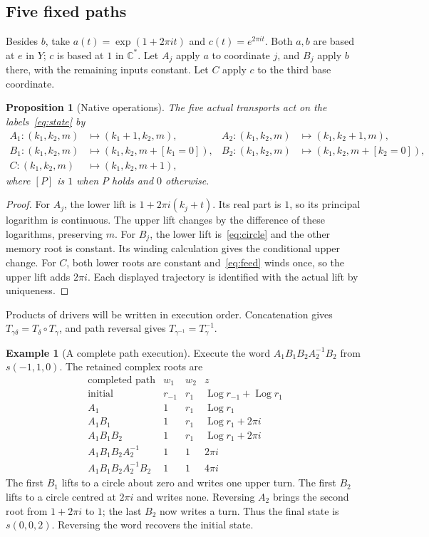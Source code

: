 \documentclass[11pt]{article}
\theoremstyle{definition}
\newtheorem{example}[definition]{Example}
\theoremstyle{plain}
\newtheorem{proposition}[definition]{Proposition}
\newcommand{\C}{\mathbb C}
\newcommand{\Log}{\operatorname{Log}}
\begin{document}
\subsection*{Five fixed paths}
Besides $b$, take $a(t)=\exp(1+2\pi it)$ and $c(t)=e^{2\pi it}$.
Both $a,b$ are based at $e$ in $Y$; $c$ is based at $1$ in $\C^*$.
Let $A_j$ apply $a$ to coordinate $j$, and $B_j$ apply $b$ there,
with the remaining inputs constant. Let $C$ apply $c$ to the third
base coordinate.

\begin{proposition}[Native operations]\label{prop:gates}
The five actual transports act on the labels~\eqref{eq:state} by
\begin{align*}
 A_1:(k_1,k_2,m)&\longmapsto(k_1+1,k_2,m),&
 A_2:(k_1,k_2,m)&\longmapsto(k_1,k_2+1,m),\\
 B_1:(k_1,k_2,m)&\longmapsto(k_1,k_2,m+[k_1=0]),&
 B_2:(k_1,k_2,m)&\longmapsto(k_1,k_2,m+[k_2=0]),\\
 C:(k_1,k_2,m)&\longmapsto(k_1,k_2,m+1),
\end{align*}
where $[P]$ is $1$ when $P$ holds and $0$ otherwise.
\end{proposition}
\begin{proof}
For $A_j$, the lower lift is $1+2\pi i(k_j+t)$.
Its real part is $1$, so its principal logarithm is continuous.
The upper lift changes by the difference of these logarithms,
preserving $m$. For $B_j$, the lower lift is~\eqref{eq:circle}
and the other memory root is constant. Its winding calculation
gives the conditional upper change. For $C$, both lower roots are
constant and~\eqref{eq:feed} winds once, so the upper lift adds
$2\pi i$. Each displayed trajectory is identified with the actual
lift by uniqueness.
\end{proof}

Products of drivers will be written in execution order.
Concatenation gives $T_{\gamma\delta}=T_\delta\circ T_\gamma$,
and path reversal gives $T_{\gamma^{-1}}=T_\gamma^{-1}$.

\begin{example}[A complete path execution]\label{ex:execution}
Execute the word $A_1B_1B_2A_2^{-1}B_2$ from
$s(-1,1,0)$. The retained complex roots are
\[
\begin{array}{c|ccc}
 \text{completed path}&w_1&w_2&z\\ \hline
 \text{initial}&r_{-1}&r_1&\Log r_{-1}+\Log r_1\\
 A_1&1&r_1&\Log r_1\\
 A_1B_1&1&r_1&\Log r_1+2\pi i\\
 A_1B_1B_2&1&r_1&\Log r_1+2\pi i\\
 A_1B_1B_2A_2^{-1}&1&1&2\pi i\\
 A_1B_1B_2A_2^{-1}B_2&1&1&4\pi i
\end{array}
\]
The first $B_1$ lifts to a circle about zero and writes one upper
turn. The first $B_2$ lifts to a circle centred at $2\pi i$ and
writes none. Reversing $A_2$ brings the second root from $1+2\pi i$
to $1$; the last $B_2$ now writes a turn. Thus the final state is
$s(0,0,2)$. Reversing the word recovers the initial state.
\end{example}
\end{document}
